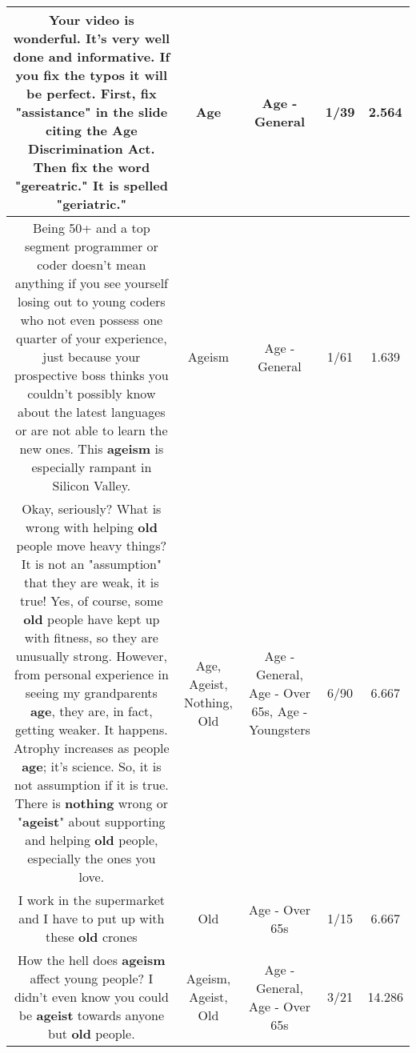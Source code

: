 \documentclass[11pt]{article}
\newlength\mylength
\begin{document}
\begin{center}
\begin{longtable}{|C{.65\mylength}|C{.30\mylength}|C{.12\mylength}|C{.12\mylength}|C{.12\mylength}|}
  \small Your video is wonderful. It's very well done and informative. If you fix the typos it will be perfect. First, fix "assistance" in the slide citing the \textbf{Age} Discrimination Act. Then fix the word "gereatric." It is spelled "geriatric."\normalsize   & Age & Age - General & 1/39 & 2.564 \\  \hline
  \small Being 50+ and a top segment programmer or coder doesn't mean anything if you see yourself losing out to young coders who not even possess one quarter of your experience, just because your prospective boss thinks you couldn't possibly know about the latest languages or are not able to learn the new ones. This \textbf{ageism} is especially rampant in Silicon Valley.\normalsize   & Ageism & Age - General & 1/61 & 1.639 \\  \hline
  \small Okay, seriously? What is wrong with helping \textbf{old} people move heavy things? It is not an "assumption" that they are weak, it is true! Yes, of course, some \textbf{old} people have kept up with fitness, so they are unusually strong. However, from personal experience in seeing my grandparents \textbf{age}, they are, in fact, getting weaker. It happens. Atrophy increases as people \textbf{age}; it's science. So, it is not assumption if it is true. There is \textbf{nothing} wrong or "\textbf{ageist}" about supporting and helping \textbf{old} people, especially the ones you love.\normalsize   & Age, Ageist, Nothing, Old & Age - General, Age - Over 65s, Age - Youngsters & 6/90 & 6.667 \\  \hline
  \small I work in the supermarket and I have to put up with these \textbf{old} crones\normalsize   & Old & Age - Over 65s & 1/15 & 6.667 \\  \hline
  \small How the hell does \textbf{ageism} affect young people? I didn't even know you could be \textbf{ageist} towards anyone but \textbf{old} people.\normalsize   & Ageism, Ageist, Old & Age - General, Age - Over 65s & 3/21 & 14.286 \\  \hline

\end{longtable}
\end{center}
\end{document}
